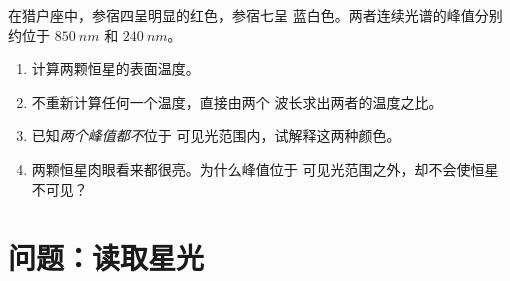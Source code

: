 \begin{exercise}[$\star\star\star$]\label{exo:g10:light-spectra:15}
在猎户座中，参宿四呈明显的红色，参宿七呈
蓝白色。两者连续光谱的峰值分别约位于 $\qty{850}{nm}$ 和
$\qty{240}{nm}$。
\begin{enumerate}
  \item 计算两颗恒星的表面温度。
  \item 不重新计算任何一个温度，直接由两个
        波长求出两者的温度之比。
  \item 已知\emph{两个峰值都不}位于
        可见光范围内，试解释这两种颜色。
  \item 两颗恒星肉眼看来都很亮。为什么峰值位于
        可见光范围之外，却不会使恒星不可见？
\end{enumerate}
\end{exercise}

\section{问题：读取星光}


